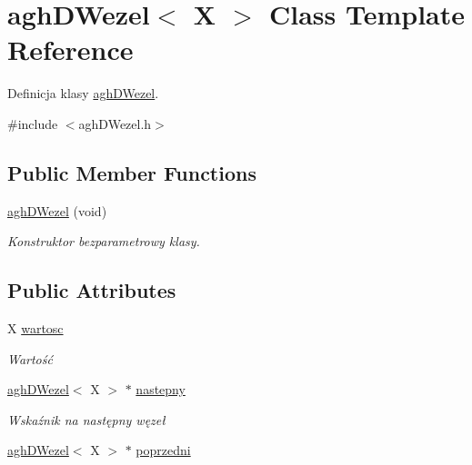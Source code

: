 \hypertarget{classaghDWezel}{\section{agh\-D\-Wezel$<$ \-X $>$ \-Class \-Template \-Reference}
\label{classaghDWezel}
}


\-Definicja klasy \hyperlink{classaghDWezel}{agh\-D\-Wezel}.  




{\ttfamily \#include $<$agh\-D\-Wezel.\-h$>$}

\subsection*{\-Public \-Member \-Functions}
\begin{DoxyCompactItemize}
\item 
\hypertarget{classaghDWezel_aef137234a1c09df64921db031990f0e2}{\hyperlink{classaghDWezel_aef137234a1c09df64921db031990f0e2}{agh\-D\-Wezel} (void)}\label{classaghDWezel_aef137234a1c09df64921db031990f0e2}

\begin{DoxyCompactList}\small\item\em \-Konstruktor bezparametrowy klasy. \end{DoxyCompactList}\end{DoxyCompactItemize}
\subsection*{\-Public \-Attributes}
\begin{DoxyCompactItemize}
\item 
\hypertarget{classaghDWezel_a96596a92d95c56c2b2e2de0508cf17b6}{\-X \hyperlink{classaghDWezel_a96596a92d95c56c2b2e2de0508cf17b6}{wartosc}}\label{classaghDWezel_a96596a92d95c56c2b2e2de0508cf17b6}

\begin{DoxyCompactList}\small\item\em \-Wartość \end{DoxyCompactList}\item 
\hypertarget{classaghDWezel_a17dcd876910d65d9f67f9cf2f6648bd9}{\hyperlink{classaghDWezel}{agh\-D\-Wezel}$<$ \-X $>$ $\ast$ \hyperlink{classaghDWezel_a17dcd876910d65d9f67f9cf2f6648bd9}{nastepny}}\label{classaghDWezel_a17dcd876910d65d9f67f9cf2f6648bd9}

\begin{DoxyCompactList}\small\item\em \-Wskaźnik na następny węzeł \end{DoxyCompactList}\item 
\hyperlink{classaghDWezel}{agh\-D\-Wezel}$<$ \-X $>$ $\ast$ \hyperlink{classaghDWezel_ada1ab89feb17b0bf66727b673f6d3aac}{poprzedni}
\end{DoxyCompactItemize}


